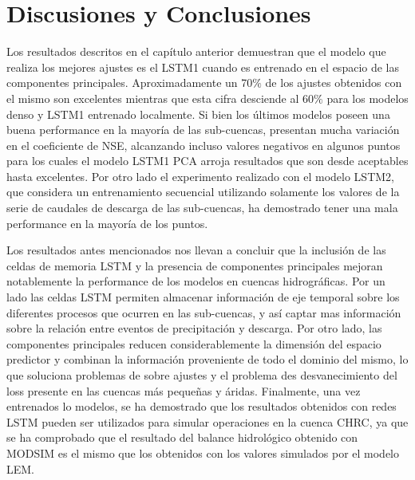 \chapter{Discusiones y Conclusiones}
\label{Discusiones y conclusiones}

Los resultados descritos en el capítulo anterior demuestran que el modelo que realiza los mejores ajustes es el LSTM1 cuando es entrenado en 
el espacio de las componentes principales. Aproximadamente un 70$\%$ de los ajustes obtenidos con el mismo son excelentes mientras que esta cifra  
desciende al 60$\%$ para los modelos denso y LSTM1 entrenado localmente. Si bien los últimos modelos poseen una buena performance en la mayoría de 
las sub-cuencas, presentan mucha variación en el coeficiente de NSE, alcanzando incluso valores negativos en algunos puntos para los cuales 
el modelo LSTM1 PCA arroja resultados que son desde aceptables hasta excelentes. Por otro lado el experimento realizado con el modelo LSTM2, que considera 
un entrenamiento secuencial utilizando solamente los valores de la serie de caudales de descarga de las sub-cuencas, ha demostrado
tener una  mala performance en la mayoría de los puntos. 

Los resultados antes mencionados nos llevan a concluir que la inclusión de las celdas de memoria LSTM y la presencia de componentes principales 
mejoran notablemente la performance de los modelos en cuencas hidrográficas. 
Por un lado las celdas LSTM permiten almacenar información de eje temporal sobre los diferentes procesos  que ocurren en  las sub-cuencas,
y así captar mas información sobre la relación entre eventos de precipitación y descarga. Por otro lado, 
las componentes principales reducen considerablemente la dimensión del espacio predictor
y combinan la información proveniente de todo el dominio del mismo, lo que soluciona problemas de sobre ajustes y el problema
des desvanecimiento del loss presente en las cuencas más pequeñas y áridas. 
Finalmente, una vez entrenados lo modelos, se ha demostrado que los resultados obtenidos con redes LSTM
pueden ser utilizados para simular operaciones en la cuenca CHRC, ya que se ha comprobado que
el resultado del balance hidrológico obtenido con MODSIM es el mismo que los obtenidos con los valores simulados por el modelo LEM.

